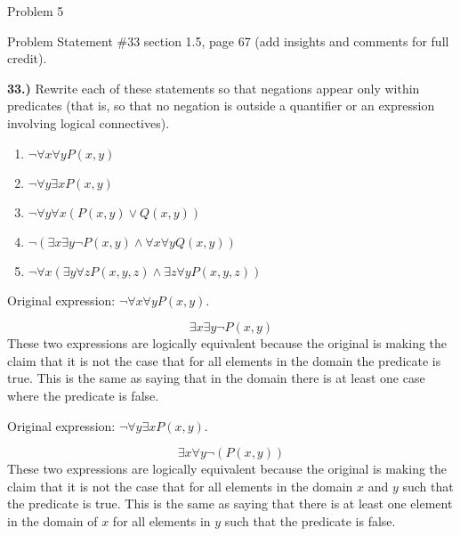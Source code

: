 \begin{problem}{Problem 5}
    \begin{statement}{Problem Statement}
        \#33 section 1.5, page 67 (add insights and comments for full credit). \vspace*{1em}

        \noindent \textbf{33.)} Rewrite each of these statements so that negations appear only within predicates (that is, so that no negation is outside a quantifier or an expression involving logical 
        connectives).

        \begin{enumerate}[label=(\alph*)]
            \item $\neg \forall x \forall y P(x,y)$
            \item $\neg \forall y \exists x P(x,y)$
            \item $\neg \forall y \forall x (P(x,y) \vee Q(x,y))$
            \item $\neg(\exists x \exists y \neg P(x,y) \wedge \forall x \forall y Q(x,y))$
            \item $\neg \forall x (\exists y \forall z P(x,y,z) \wedge \exists z \forall y P(x,y,z))$
        \end{enumerate}
    \end{statement}

    \begin{Highlight}
        Original expression: $\neg \forall x \forall y P(x,y)$.

        \setcounter{equation}{0}
        \begin{equation}
            \exists x \exists y \neg P(x,y) 
        \end{equation}
        These two expressions are logically equivalent because the original is making the claim that it is not the case that for all elements in the domain the predicate is true. This is the same as saying that in 
        the domain there is at least one case where the predicate is false.
    \end{Highlight}

    \begin{Highlight}
        Original expression: $\neg \forall y \exists x P(x,y)$.

        \begin{equation}
            \exists x \forall y \neg (P(x,y))
        \end{equation}
        These two expressions are logically equivalent because the original is making the claim that it is not the case that for all elements in the domain $x$ and $y$ such that the predicate is true. This is the same 
        as saying that there is at least one element in the domain of $x$ for all elements in $y$ such that the predicate is false.
    \end{Highlight}


\end{problem}

